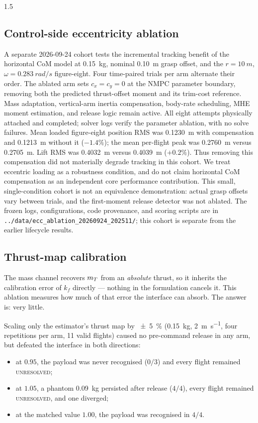 \begin{spacing}{1.5}
\subsection{Control-side eccentricity ablation}\label{sec:eval:eccablation}
A separate 2026-09-24 cohort tests the incremental tracking benefit of the
horizontal CoM model at \SI{0.15}{kg}, nominal \SI{0.10}{m} grasp offset,
and the $r=\SI{10}{m}$, $\omega=\SI{0.283}{rad/s}$ figure-eight.
Four time-paired trials per arm alternate their order. The ablated arm sets
$c_x=c_y=0$ at the NMPC parameter boundary, removing both the predicted
thrust-offset moment and its trim-cost reference. Mass adaptation, vertical-arm
inertia compensation, body-rate scheduling, MHE moment estimation, and release
logic remain active. All eight attempts physically attached and completed;
solver logs verify the parameter ablation, with no solve failures.
Mean loaded figure-eight position RMS was \SI{0.1230}{m} with compensation
and \SI{0.1213}{m} without it ($-1.4\%$); the mean per-flight peak was
\SI{0.2760}{m} versus \SI{0.2705}{m}. Lift RMS was \SI{0.4032}{m}
versus \SI{0.4039}{m} ($+0.2\%$). Thus removing this compensation did not
materially degrade tracking in this cohort. We treat eccentric loading as a
robustness condition, and do not claim horizontal CoM compensation as an
independent core performance contribution. This small, single-condition cohort
is not an equivalence demonstration: actual grasp offsets vary between trials,
and the first-moment release detector was not ablated. The frozen logs,
configurations, code provenance, and scoring scripts are in
\texttt{../data/ecc\_ablation\_20260924\_202511/}; this cohort is separate from
the earlier lifecycle results.

\subsection{Thrust-map calibration}\label{sec:eval:thrustcal}

The mass channel recovers $m_T$ from an \emph{absolute} thrust, so it inherits
the calibration error of $k_f$ directly --- nothing in the formulation cancels
it. This ablation measures how much of that error the interface can absorb. The
answer is: very little.

Scaling only the estimator's thrust map by \SI{\pm5}{\percent}
(\SI{0.15}{\kg}, \SI{2}{\meter\per\second}, four repetitions per arm, 11 valid
flights) caused no pre-command release in any arm, but defeated the interface in
both directions:
\begin{itemize}
\item at $0.95$, the payload was never recognised ($0/3$) and every flight
remained \textsc{unresolved};
\item at $1.05$, a phantom \SI{+0.09}{\kg} persisted after release ($4/4$), every
flight remained \textsc{unresolved}, and one diverged;
\item at the matched value $1.00$, the payload was recognised in $4/4$.
\end{itemize}


\end{spacing}
